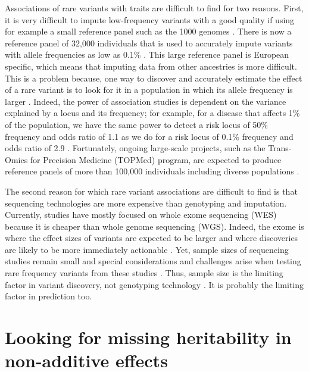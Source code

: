 Associations of rare variants with traits are difficult to find for two reasons. 
First, it is very difficult to impute low-frequency variants with a good quality if using for example a small reference panel such as the 1000 genomes \cite[]{nikpay2015comprehensive}. There is now a reference panel of 32,000 individuals that is used to accurately impute variants with allele frequencies as low as 0.1\% \cite[]{mccarthy2016reference}.
This large reference panel is European specific, which means that imputing data from other ancestries is more difficult. This is a problem because, one way to discover and accurately estimate the effect of a rare variant is to look for it in a population in which its allele frequency is larger \cite[]{moltke2014common,minster2016thrifty}. 
Indeed, the power of association studies is dependent on the variance explained by a locus and its frequency; for example, for a disease that affects 1\% of the population, we have the same power to detect a risk locus of 50\% frequency and odds ratio of 1.1 as we do for a risk locus of 0.1\% frequency and odds ratio of 2.9 \cite[]{wray2018common}.
Fortunately, ongoing large-scale projects, such as the Trans-Omics for Precision Medicine (TOPMed) program, are expected to produce reference panels of more than 100,000 individuals including diverse populations \cite[]{taliun2019sequencing}.

The second reason for which rare variant associations are difficult to find is that sequencing technologies are more expensive than genotyping and imputation. Currently, studies have mostly focused on whole exome sequencing (WES) because it is cheaper than whole genome sequencing (WGS). 
Indeed, the exome is where the effect sizes of variants are expected to be larger and where discoveries are likely to be more immediately actionable \cite[]{zuk2014searching}. 
Yet, sample sizes of sequencing studies remain small and special considerations and challenges arise when testing rare frequency variants from these studies \cite[]{auer2015rare}.
Thus, sample size is the limiting factor in variant discovery, not genotyping technology \cite[]{wray2018common}. 
It is probably the limiting factor in prediction too.

\section{Looking for missing heritability in non-additive effects}

